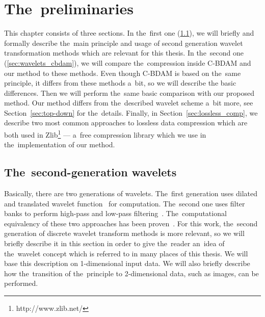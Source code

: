 \chapter{The~preliminaries}\label{chap:preliminaries}

This chapter consists of three sections. In the~first one (\ref{sec:wavelets}), we will briefly and formally describe the~main principle and usage of second generation wavelet transformation methods which are relevant for this thesis. In the~second one (\ref{sec:wavelets_cbdam}), we will compare the~compression inside C-BDAM and our method to these methods. Even though C-BDAM is based on the~same principle, it differs from these methods a~bit, so we will describe the basic differences. Then we will perform the~same basic comparison with our proposed method. Our method differs from the~described wavelet scheme a~bit more, see Section~\ref{sec:top-down} for the~details. Finally, in Section~\ref{sec:lossless_comp}, we describe two most common approaches to lossless data compression which are both used in Zlib\footnote{http://www.zlib.net/} --- a~free compression library which we use in the~implementation of our method.

\section{The~second-generation wavelets}\label{sec:wavelets}
Basically, there are two generations of wavelets. The~first generation uses dilated and translated wavelet function~\cite{waveletsTutorial} for computation. The~second one uses filter banks to perform high-pass and low-pass filtering~\cite{waveletsLifting}. The~computational equivalency of these two approaches has been proven~\cite{waveletsEquiv}. For this work, the~second generation of discrete wavelet transform methods is more relevant, so we will briefly describe it in this section in order to give the~reader an~idea of the~wavelet concept which is referred to in many places of this thesis. We will base this description on 1-dimensional input data. We will also briefly describe how the~transition of the~principle to 2-dimensional data, such as images, can be performed.

